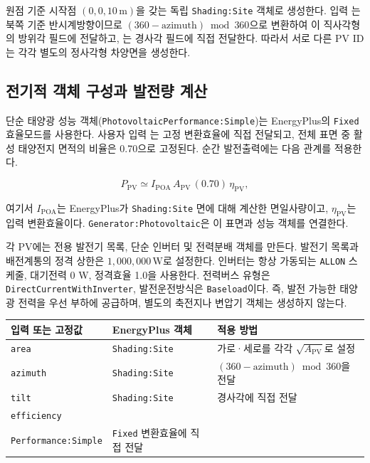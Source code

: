 원점 기준 시작점 $(0,0,10\,\mathrm{m})$을 갖는 독립 \texttt{Shading:}\allowbreak\texttt{Site} 객체로 생성한다. 입력 는 북쪽 기준 반시계방향이므로 $(360-\mathrm{azimuth})\bmod 360$으로 변환하여 이 직사각형의 방위각 필드에 전달하고, 는 경사각 필드에 직접 전달한다. 따라서 서로 다른 PV ID는 각각 별도의 정사각형 차양면을 생성한다.

\subsection{전기적 객체 구성과 발전량 계산}

단순 태양광 성능 객체(\texttt{PhotovoltaicPerformance:}\allowbreak\texttt{Simple})는 EnergyPlus의 \texttt{Fixed} 효율모드를 사용한다. 사용자 입력 는 고정 변환효율에 직접 전달되고, 전체 표면 중 활성 태양전지 면적의 비율은 0.70으로 고정된다. 순간 발전출력에는 다음 관계를 적용한다.

\begin{equation}
  P_{\mathrm{PV}} \simeq I_{\mathrm{POA}}\,A_{\mathrm{PV}}\,(0.70)\,\eta_{\mathrm{PV}},
  \label{eq:pv-simple-power}
\end{equation}

여기서 $I_{\mathrm{POA}}$는 EnergyPlus가 \texttt{Shading:Site} 면에 대해 계산한 면일사량이고, $\eta_{\mathrm{PV}}$는 입력 변환효율이다. \texttt{Generator:Photovoltaic}은 이 표면과 성능 객체를 연결한다.

각 PV에는 전용 발전기 목록, 단순 인버터 및 전력분배 객체를 만든다. 발전기 목록과 배전계통의 정격 상한은 $1{,}000{,}000\,\mathrm{W}$로 설정한다. 인버터는 항상 가동되는 \texttt{ALLON} 스케줄, 대기전력 0 W, 정격효율 1.0을 사용한다. 전력버스 유형은 \texttt{DirectCurrentWithInverter}, 발전운전방식은 \texttt{Baseload}이다. 즉, 발전 가능한 태양광 전력을 우선 부하에 공급하며, 별도의 축전지나 변압기 객체는 생성하지 않는다.

\begin{defaulttable}
  \caption{PV 입력값과 EnergyPlus 객체 필드의 대응}
  \label{tab:pv-input-mapping}
  \footnotesize
  \begin{tabularx}{\textwidth}{>{\raggedright\arraybackslash}p{2.65cm}>{\raggedright\arraybackslash}p{4.35cm}X}
    \toprule
    입력 또는 고정값 & EnergyPlus 객체 & 적용 방법 \\ \midrule
    \texttt{area} & \texttt{Shading:Site} & 가로·세로를 각각 $\sqrt{A_{\mathrm{PV}}}$로 설정 \\
    \texttt{azimuth} & \texttt{Shading:Site} & $(360-\mathrm{azimuth})\bmod 360$을 전달 \\
    \texttt{tilt} & \texttt{Shading:Site} & 경사각에 직접 전달 \\
    \texttt{efficiency} & \makecell[l]{\texttt{Photovoltaic}\\\texttt{Performance:Simple}} & \texttt{Fixed} 변환효율에 직접 전달 \\  \bottomrule
  \end{tabularx}
\end{defaulttable}


